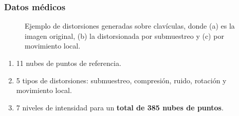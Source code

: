 \begin{frame}
  \frametitle{Datos médicos}
  \vspace{-1cm}
    \begin{figure}[htp]
      \caption{Ejemplo de distorsiones generadas sobre clavículas, donde (a) es la imagen original, 
      (b) la distorsionada por submuestreo y (c) por movimiento local.}
      \label{fig:DistorsionesGeneradas}
    \end{figure}
  \vspace{-.3cm}
    \begin{enumerate}[<+->]
      \item \alert{11 nubes de puntos} de referencia.  
      \item \alert{5} tipos de \alert{distorsiones}: 
        submuestreo, compresión, ruido, rotación y movimiento local.
      \item \alert{7 niveles} de intensidad para un \textbf{total de 385 nubes de puntos}.
    \end{enumerate}
\end{frame}

